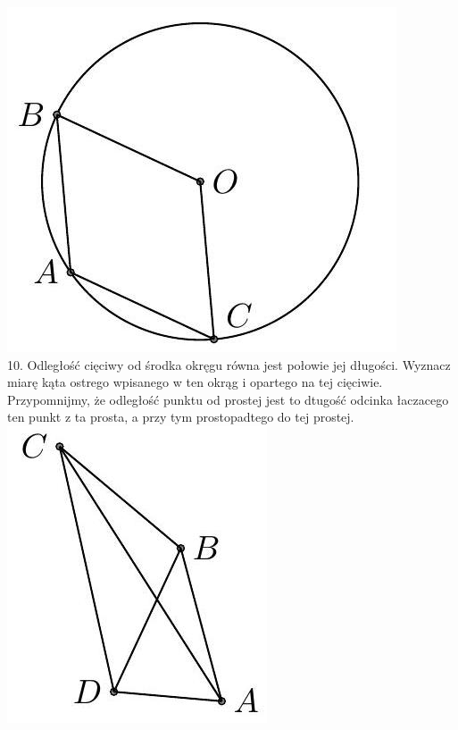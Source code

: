 \documentclass[10pt]{article}
\begin{document}
\includegraphics[max width=\textwidth, center]{2024_11_21_71f62bd117d375398909g-183(1)}\\
10. Odległość cięciwy od środka okręgu równa jest połowie jej długości. Wyznacz miarę kąta ostrego wpisanego w ten okrąg i opartego na tej cięciwie. Przypomnijmy, że odległość punktu od prostej jest to dtugość odcinka łaczacego ten punkt z ta prosta, a przy tym prostopadtego do tej prostej.\\
\includegraphics[max width=\textwidth, center]{2024_11_21_71f62bd117d375398909g-183}\\
\end{document}
